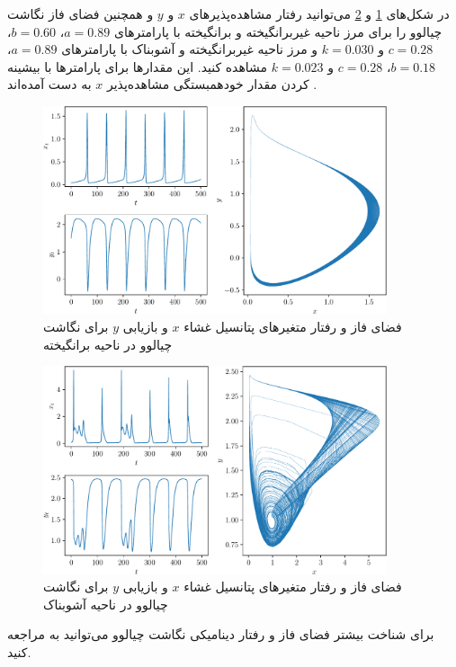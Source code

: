 در شکل‌های
\ref{fig:xy_excitable} و \ref{fig:xy_chaotic}
می‌توانید رفتار مشاهده‌پذیرهای
\( x \) و \( y \)
و همچنین فضای فاز نگاشت چیالوو را برای مرز ناحیه غیربرانگیخته و برانگیخته با پارامتر‌های
\( a = 0.89 \)، \( b = 0.60 \)، \( c = 0.28 \) و \( k = 0.030 \)
و مرز ناحیه غیربرانگیخته و آشوبناک با پارامتر‌های
\( a = 0.89 \)، \( b = 0.18 \)، \( c = 0.28 \) و \( k = 0.023 \)
مشاهده کنید.
این مقدارها برای پارامترها با بیشینه کردن مقدار خودهمبستگی مشاهده‌پذیر
\( x \)
به دست آمده‌اند
\cite{moraes2023}.

\begin{figure}[!ht]
    \centering
    \includegraphics[width=0.9\textwidth]{figures/xy_excitable}
    \caption{
        فضای فاز و رفتار متغیرهای پتانسیل غشاء
        \( x \)
        و بازیابی
        \( y \)
        برای نگاشت چیالوو در ناحیه برانگیخته
    }
    \label{fig:xy_excitable}
\end{figure}

\begin{figure}[!ht]
    \centering
    \includegraphics[width=0.9\textwidth]{figures/xy_chaotic}
    \caption{
        فضای فاز و رفتار متغیرهای پتانسیل غشاء
        \( x \)
        و بازیابی
        \( y \)
        برای نگاشت چیالوو در ناحیه آشوبناک
    }
    \label{fig:xy_chaotic}
\end{figure}

برای شناخت بیشتر فضای فاز و رفتار دینامیکی نگاشت چیالوو می‌توانید به \cite{jing2006,courbage2010,wang2018,moraes2023,pilarczyk2023,trujillo2023} مراجعه کنید.
